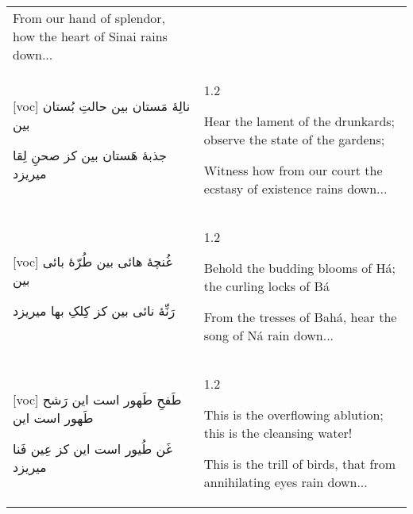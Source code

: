 \documentclass[11pt]{article}
\makeatletter
\newenvironment{orig}
  {\begin{farsi}[voc]}
  {\end{farsi}}
\newenvironment{trans}
  {\Large\begin{spacing}{1.2}\raggedright}
  {\end{spacing}}
\newenvironment{word}
  {\begin{longtable}[t]{p{3.5in}@{\hspace{3em}}p{2in}}}
  {\end{longtable}}
\newcommand{\ayat}[2]{\begin{orig}#1\end{orig} & \begin{trans}#2\end{trans}}
\makeatother
\begin{document}
\begin{word}
{From our hand of splendor, how the heart of Sinai rains down...
} \\ \ayat{
نالِۀ مَستان بین حالتِ بُستان بین

جذبۀ هَستان بین کز صحنِ لِقا میریزد
}{
Hear the lament of the drunkards; observe the state of the gardens;

Witness how from our court the ecstasy of existence rains down...
} \\ \ayat{
غُنچۀ هائی بین طُرّۀ بائی بین

رَنِّۀ نائی بین کز کِلکِ بها میریزد
}{
Behold the budding blooms of Há; the curling locks of Bá

From the tresses of Bahá, hear the song of Ná rain down...
} \\ \ayat{
طَفحِ طَهور است این رَشح طَهور است این

غَن طُیور است این کز عِین فَنا میریزد
}{
This is the overflowing ablution; this is the cleansing water!

This is the trill of birds, that from annihilating eyes rain down...
}
\end{word}
\end{document}
